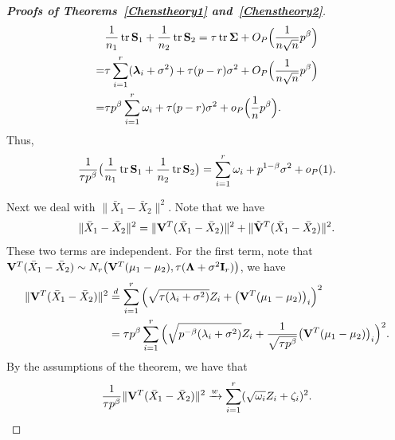 \documentclass[3p]{elsarticle}
\DeclareMathOperator{\mytr}{tr}
\newcommand{\bfsym}[1]{\ensuremath{\boldsymbol{#1}}}
\def\blambda {\bfsym {\lambda}}        \def\bLambda {\bfsym {\Lambda}}
\theoremstyle{plain}
\theoremstyle{definition}
\theoremstyle{remark}
\begin{document}
\begin{appendices}
\begin{proof}[\textbf{Proofs of Theorems~\ref{Chenstheory1} and~\ref{Chenstheory2}}]
$$\begin{aligned}
        &\frac{1}{n_1}\mytr \BS_1+\frac{1}{n_2}\mytr \BS_2=
    \tau \mytr \bSigma+O_P\Big(\frac{1}{n\sqrt{n}}p^{\beta}\Big)\\
        =&\tau \sum_{i=1}^r (\blambda_i+\sigma^2)+\tau(p-r)\sigma^2+O_P\Big(\frac{1}{n\sqrt{n}}p^{\beta}\Big)\\
        =&\tau p^{\beta} \sum_{i=1}^r \omega_i+\tau(p-r)\sigma^2+o_P\Big(\frac{1}{n}p^{\beta}\Big).
    \end{aligned}
    $$
Thus,
        \begin{equation}\label{eq:kkk1}
        \frac{1}{\tau p^\beta}\big(\frac{1}{n_1}\mytr \BS_1+\frac{1}{n_2}\mytr \BS_2\big)
        =\sum_{i=1}^r \omega_i+p^{1-\beta}\sigma^2+o_P(1).
        \end{equation}

    Next we deal with $\|\bar{X}_1-\bar{X}_2\|^2$.
    Note that we have
    $$
    \|\bar{X}_1-\bar{X}_2\|^2=
    \|\mathbf{V}^T(\bar{X}_1-\bar{X}_2)\|^2+
    \|\tilde{\mathbf{V}}^T(\bar{X}_1-\bar{X}_2)\|^2.
    $$
    These two terms are independent.
    For the first term, note that $\BV^T(\bar{X}_1-\bar{X}_2)\sim N_r\big(\BV^T (\mu_1-\mu_2),\tau (\bLambda+\sigma^2 \BI_r)\big)$, we have
    $$
    \begin{aligned}
        \|\mathbf{V}^T(\bar{X}_1-\bar{X}_2)\|^2&\overset{d}{=}
        \sum_{i=1}^r \Big(\sqrt{\tau (\lambda_i+\sigma^2)}Z_i+\big(\mathbf{V}^T (\mu_1-\mu_2)\big)_i \Big)^2\\
        &=\tau p^{\beta}
        \sum_{i=1}^r
        \Big( \sqrt{p^{-\beta}(\lambda_i+\sigma^2)}Z_i+\frac{1}{\sqrt{\tau p^{\beta}}}\big(\mathbf{V}^T (\mu_1-\mu_2)\big)_i \Big)^2.
    \end{aligned}
    $$
    By the assumptions of the theorem,  we have that
    \begin{equation}\label{eq:kkk2}
    \begin{aligned}
        \frac{1}{\tau p^{\beta}}\|\mathbf{V}^T(\bar{X}_1-\bar{X}_2)\|^2
        \xrightarrow{w}
        \sum_{i=1}^r (\sqrt{\omega_i} Z_i+\zeta_i)^2.
    \end{aligned}
    \end{equation}


\end{proof}
\end{appendices}
\end{document}
